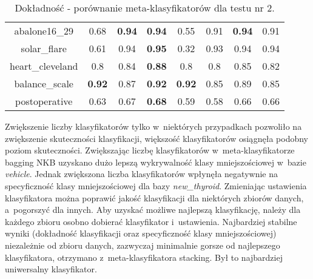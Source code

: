 \begin{table}[H]
\begin{center}
{\begin{tabular}{c|ccccccc}
				abalone16\_29&0.68&\textbf{0.94}&\textbf{0.94}&0.55&0.91&\textbf{0.94}&0.91\\%
				solar\_flare&0.61&0.94&\textbf{0.95}&0.32&0.93&0.94&0.94\\%
				heart\_cleveland&0.8&0.84&\textbf{0.88}&0.8&0.8&0.85&0.82\\%
				balance\_scale&\textbf{0.92}&0.87&\textbf{0.92}&\textbf{0.92}&0.85&0.89&0.85\\%
				postoperative&0.63&0.67&\textbf{0.68}&0.59&0.58&0.66&0.66\\%
			\end{tabular}}
			\caption{Dokładność - porównanie meta-klasyfikatorów dla testu nr 2.}
			\label{accmeta2}
		\end{center}
	\end{table}
Zwiększenie liczby klasyfikatorów tylko w~niektórych przypadkach pozwoliło na zwiększenie skuteczności klasyfikacji, większość klasyfikatorów osiągnęła podobny poziom skuteczności. Zwiększając liczbę klasyfikatorów w~meta-klasyfikatorze bagging NKB uzyskano dużo lepszą wykrywalność klasy mniejszościowej w~bazie \textit{vehicle}. Jednak zwiększona liczba klasyfikatorów wpłynęła negatywnie na specyficzność klasy mniejszościowej dla bazy \textit{new\_thyroid}. Zmieniając ustawienia klasyfikatora można poprawić jakość klasyfikacji dla niektórych zbiorów danych, a~pogorszyć dla innych. Aby uzyskać możliwe najlepszą klasyfikację, należy dla każdego zbioru osobno dobierać klasyfikator i~ustawienia. Najbardziej stabilne wyniki (dokładność klasyfikacji oraz specyficzność klasy mniejszościowej) niezależnie od zbioru danych, zazwyczaj minimalnie gorsze od najlepszego klasyfikatora, otrzymano z~meta-klasyfikatora stacking. Był to najbardziej uniwersalny klasyfikator.

